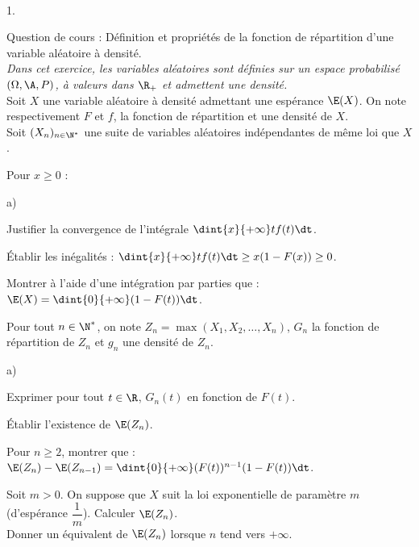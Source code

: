 \documentclass[11pt]{article}%
\begin{document}
\begin{exerciceAP}~
  \begin{noliste}{1.}
    \setlength{\itemsep}{2mm}
  \item Question de cours : Définition et propriétés de la fonction de
    répartition d'une variable aléatoire à densité.\\
    {\it Dans cet exercice, les variables aléatoires sont définies sur
      un espace probabilisé $(\Omega,\A,P)$, à valeurs dans $\R_+$ et
      admettent une densité.}\\
    Soit $X$ une variable aléatoire à densité admettant une espérance
    $\E(X)$. On note respectivement $F$ et $f$, la fonction de
    répartition et une densité de $X$.\\
    Soit $(X_n)_{n\in\N^*}$ une suite de variables aléatoires
    indépendantes de même loi que $X$.

  \item Pour $x\geq 0$ :
    \begin{noliste}{a)}
      \setlength{\itemsep}{2mm}
    \item Justifier la convergence de l'intégrale $\dint{x}{+\infty}
      tf(t)\dt$.

    \item Établir les inégalités : $\dint{x}{+\infty} tf(t) \dt \geq
      x(1-F(x))\geq 0$.

    \item Montrer à l'aide d'une intégration par parties que :
      $\E(X)=\dint{0}{+\infty} (1-F(t))\dt$.
    \end{noliste}

  \item Pour tout $n\in\N^*$, on note $Z_n=\max(X_1,X_2,\hdots,X_n)$,
    $G_n$ la fonction de répartition de $Z_n$ et $g_n$ une densité de
    $Z_n$.
    \begin{noliste}{a)}
    \setlength{\itemsep}{2mm}
    \item Exprimer pour tout $t\in\R$, $G_n(t)$ en fonction de $F(t)$.
    \item Établir l'existence de $\E(Z_n)$.
    \item Pour $n\geq 2$, montrer que : $\E(Z_n)-\E(Z_{n-1})=
      \dint{0}{+\infty} (F(t))^{n-1}(1-F(t))\dt$.
    \item Soit $m>0$. On suppose que $X$ suit la loi exponentielle de
      paramètre $m$ (d'espérance $\dfrac{1}{m}$). Calculer $\E(Z_n)$.\\
      Donner un équivalent de $\E(Z_n)$ lorsque $n$ tend vers
      $+\infty$.
    \end{noliste}
  \end{noliste}
\end{exerciceAP}
\end{document}
